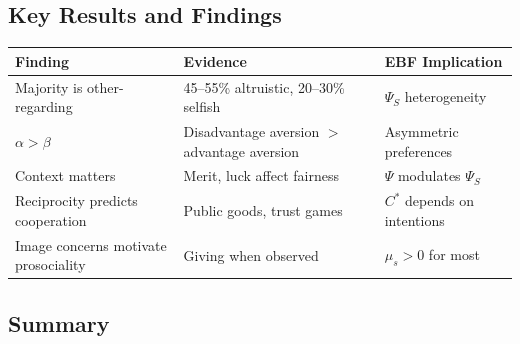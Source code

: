 \subsection{Key Results and Findings}
\label{sec:aj-results}


\begin{center}
\renewcommand{\arraystretch}{1.3}
\begin{tabular}{@{}p{4cm}p{5.5cm}p{4cm}@{}}
\toprule
\textbf{Finding} & \textbf{Evidence} & \textbf{EBF Implication} \\
\midrule
Majority is other-regarding & 45--55\% altruistic, 20--30\% selfish & $\Psi_S$ heterogeneity \\
$\alpha > \beta$ & Disadvantage aversion $>$ advantage aversion & Asymmetric preferences \\
Context matters & Merit, luck affect fairness & $\Psi$ modulates $\Psi_S$ \\
Reciprocity predicts cooperation & Public goods, trust games & $C^*$ depends on intentions \\
Image concerns motivate prosociality & Giving when observed & $\mu_s > 0$ for most \\
\bottomrule
\end{tabular}
\end{center}


\subsection{Summary}


